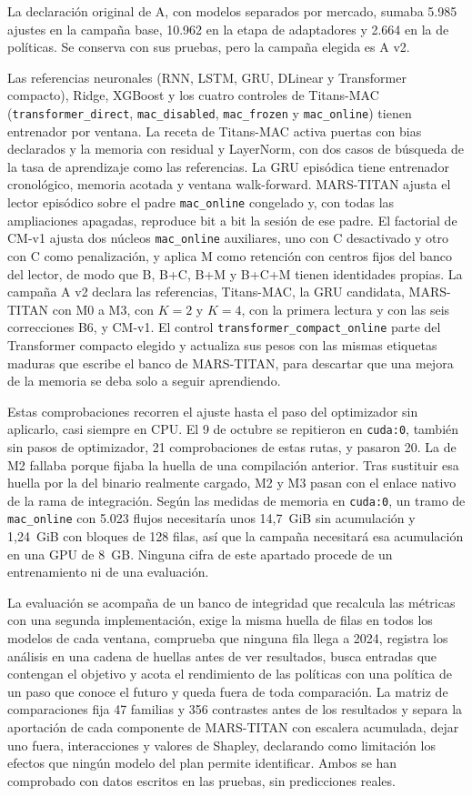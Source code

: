 \documentclass[11pt,a4paper]{report}
\begin{document}
La declaración original de A, con modelos separados por mercado, sumaba 5.985
ajustes en la campaña base, 10.962 en la etapa de adaptadores y 2.664 en la de
políticas. Se conserva con sus pruebas, pero la campaña elegida es A v2.

Las referencias neuronales (RNN, LSTM, GRU, DLinear y Transformer compacto),
Ridge, XGBoost y los cuatro controles de Titans-MAC
(\texttt{transformer\_direct}, \texttt{mac\_disabled}, \texttt{mac\_frozen} y
\texttt{mac\_online}) tienen entrenador por ventana. La receta de Titans-MAC
activa puertas con bias declarados y la memoria con residual y LayerNorm, con
dos casos de búsqueda de la tasa de aprendizaje como las referencias. La GRU
episódica tiene entrenador cronológico, memoria acotada y ventana
walk-forward. MARS-TITAN ajusta el lector episódico sobre el padre
\texttt{mac\_online} congelado y, con todas las ampliaciones apagadas,
reproduce bit a bit la sesión de ese padre. El factorial de CM-v1 ajusta dos
núcleos \texttt{mac\_online} auxiliares, uno con C desactivado y otro con C
como penalización, y aplica M como retención con centros fijos del banco del
lector, de modo que B, B+C, B+M y B+C+M tienen identidades propias. La
campaña A v2 declara las referencias, Titans-MAC, la GRU candidata,
MARS-TITAN con M0 a M3, con $K=2$ y $K=4$, con la primera lectura y con las
seis correcciones B6, y CM-v1. El control
\texttt{transformer\_compact\_online} parte del Transformer compacto elegido y
actualiza sus pesos con las mismas etiquetas maduras que escribe el banco de
MARS-TITAN, para descartar que una mejora de la memoria se deba solo a seguir
aprendiendo.

Estas comprobaciones recorren el ajuste hasta el paso del optimizador sin
aplicarlo, casi siempre en CPU. El 9 de octubre se repitieron en
\texttt{cuda:0}, también sin pasos de optimizador, 21 comprobaciones de estas
rutas, y pasaron 20. La de M2 fallaba porque fijaba la huella de una
compilación anterior. Tras sustituir esa huella por la del binario realmente
cargado, M2 y M3 pasan con el enlace nativo de la rama de integración. Según
las medidas de memoria en \texttt{cuda:0}, un tramo de
\texttt{mac\_online} con 5.023 flujos necesitaría unos 14,7~GiB sin acumulación
y 1,24~GiB con bloques de 128 filas, así que la campaña necesitará esa
acumulación en una GPU de 8~GB. Ninguna cifra de este apartado procede de un
entrenamiento ni de una evaluación.

La evaluación se acompaña de un banco de integridad que recalcula las métricas
con una segunda implementación, exige la misma huella de filas en todos los
modelos de cada ventana, comprueba que ninguna fila llega a 2024, registra los
análisis en una cadena de huellas antes de ver resultados, busca entradas que
contengan el objetivo y acota el rendimiento de las políticas con una política de
un paso que conoce el futuro y queda fuera de toda comparación. La matriz de comparaciones fija
47 familias y 356 contrastes antes de los resultados y separa la aportación de
cada componente de MARS-TITAN con escalera acumulada, dejar uno fuera,
interacciones y valores de Shapley, declarando como limitación los efectos que
ningún modelo del plan permite identificar. Ambos se han comprobado con datos
escritos en las pruebas, sin predicciones reales.
\end{document}

